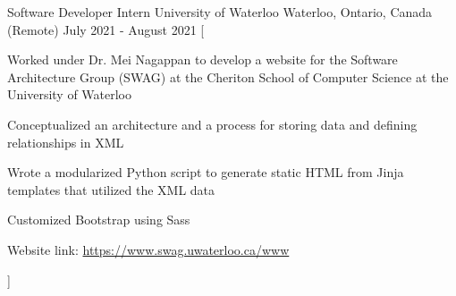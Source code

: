 

\begin{cventries}

  \cventry
    {Software Developer Intern} %
    {University of Waterloo} %
    {Waterloo, Ontario, Canada (Remote)} %
    {July 2021 - August 2021} %
    [
      \begin{cvitems} %
        \item {Worked under Dr. Mei Nagappan to develop a website for the Software Architecture Group (SWAG) at the Cheriton School of Computer Science at the University of Waterloo}
        \item {Conceptualized an architecture and a process for storing data and defining relationships in XML}
        \item {Wrote a modularized Python script to generate static HTML from Jinja templates that utilized the XML data}
        \item {Customized Bootstrap using Sass}
        \item {Website link: \href{https://www.swag.uwaterloo.ca/www}{https://www.swag.uwaterloo.ca/www}}
      \end{cvitems}
    ]


\end{cventries}
